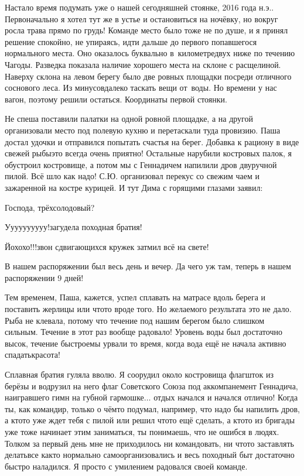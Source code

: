 Настало время подумать уже о нашей сегодняшней стоянке, 2016 года н.э.. Первоначально я хотел тут же в устье и остановиться на ночёвку, но вокруг росла трава прямо по грудь! Команде место было тоже не по душе, и я принял решение спокойно, не упираясь, идти дальше до первого попавшегося нормального места. Оно оказалось буквально в~километре\sdash двух ниже по течению Чагоды. Разведка показала наличие хорошего места на склоне с расщелиной. Наверху склона на левом берегу было две ровных площадки посреди отличного соснового леса. Из минусов\mdash далеко таскать вещи от~воды. Но времени у нас вагон, поэтому решили остаться. Координаты первой стоянки\mdash \CoordsChagodaSixteenFirst.

Не спеша поставили палатки на одной ровной площадке, а на другой организовали место под полевую кухню и перетаскали туда провизию. Паша достал удочки и отправился попытать счастья на берег. Добавка к рациону в виде свежей рыбы\mdash это всегда очень приятно! Остальные нарубили костровых палок, я обустроил костровище, а потом мы с Геннадичем напилили дров двуручной пилой. Всё шло как надо! С.Ю. организовал перекус со свежим чаем и зажаренной на костре курицей. И тут Дима с горящими глазами заявил:

\diagdash Господа, трёхсолодовый?

\diagdash У\sdash у\sdash у\sdash у\sdash у\sdash у\sdash у\sdash у\sdash у\sdash у!\mdash загудела походная братия! 

\diagdash Йо\sdash хо\sdash хо!!!\mdash звон сдвигающихся кружек затмил всё на свете! 

В нашем распоряжении был весь день и вечер. Да чего уж там, теперь в нашем распоряжении 9\thinspace\nbdash{} дней! 

Тем временем, Паша, кажется, успел сплавать на матрасе вдоль берега и поставить жерлицы или что\sdash то вроде того. Но желаемого результата это не дало. Рыба не клевала, потому что течение под нашим берегом было слишком сильным. Течение в этот раз вообще радовало! Уровень воды был достаточно высок, течение быстрое\mdash мы урвали то время, когда вода ещё не начала активно спадать\mdash кра\sdash со\sdash та!
 
Сплавная братия гуляла вволю. Я соорудил около костровища флагшток из берёзы и водрузил на него флаг Советского Союза под аккомпанемент Геннадича, наигравшего гимн на губной гармошке$\ldots$ отдых начался и начался отлично! Когда ты, как командир, только о чём\sdash то подумал, например, что надо бы напилить дров, а кто\sdash то уже ждет тебя с пилой или решил что\sdash то ещё сделать, а кто\sdash то из бригады уже тоже начинает этим заниматься, ты понимаешь, что не ошибся в людях. Толком за первый день мне не приходилось ни командовать, ни что\sdash то заставлять делать\mdash все как\sdash то нормально самоорганизовались и весь походный быт достаточно быстро наладился. Я просто с умилением радовался своей команде.

